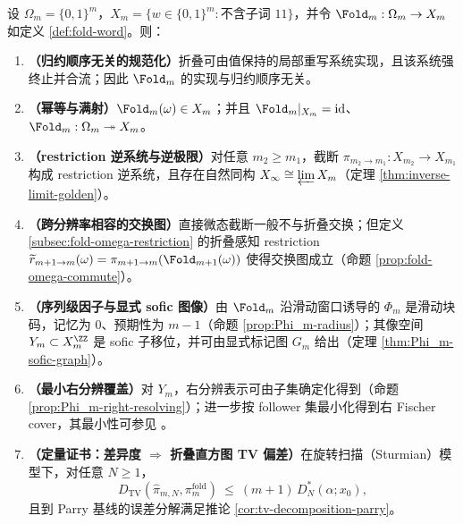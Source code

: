 \begin{theorem}\label{thm:fold-suite}
设 $\Omega_m=\{0,1\}^m$，$X_m=\{w\in\{0,1\}^m:\text{不含子词 }11\}$，并令 $\Fold_m:\Omega_m\to X_m$ 如定义 \ref{def:fold-word}。则：
\begin{enumerate}
\normalfont
  \item \textbf{（归约顺序无关的规范化）}折叠可由值保持的局部重写系统实现，且该系统强终止并合流；因此 $\Fold_m$ 的实现与归约顺序无关。
  \item \textbf{（幂等与满射）}\(\Fold_m(\omega)\in X_m\)；并且 \(\Fold_m|_{X_m}=\mathrm{id}\)、\(\Fold_m:\Omega_m\twoheadrightarrow X_m\)。
  \item \textbf{（restriction 逆系统与逆极限）}对任意 $m_2\ge m_1$，截断 $\pi_{m_2\to m_1}:X_{m_2}\to X_{m_1}$ 构成 restriction 逆系统，且存在自然同构 \(X_\infty\cong\varprojlim X_m\)（定理 \ref{thm:inverse-limit-golden}）。
\item \textbf{（跨分辨率相容的交换图）}直接微态截断一般不与折叠交换；但定义 \ref{subsec:fold-omega-restriction} 的折叠感知 restriction \(\widetilde r_{m+1\to m}(\omega)=\pi_{m+1\to m}(\Fold_{m+1}(\omega))\) 使得交换图成立（命题 \ref{prop:fold-omega-commute}）。
  \item \textbf{（序列级因子与显式 sofic 图像）}由 \(\Fold_m\) 沿滑动窗口诱导的 \(\Phi_m\) 是滑动块码，记忆为 $0$、预期性为 $m-1$（命题 \ref{prop:Phi_m-radius}）；其像空间 \(Y_m\subset X_m^{\ZZ}\) 是 sofic 子移位，并可由显式标记图 \(G_m\) 给出（定理 \ref{thm:Phi_m-sofic-graph}）。
  \item \textbf{（最小右分辨覆盖）}对 \(Y_m\)，右分辨表示可由子集确定化得到（命题 \ref{prop:Phi_m-right-resolving}）；进一步按 follower 集最小化得到右 Fischer cover，其最小性可参见 \cite{LindMarcus1995,Kitchens1998SymbolicDynamics}。
  \item \textbf{（定量证书：差异度 \(\Rightarrow\) 折叠直方图 TV 偏差）}在旋转扫描（Sturmian）模型下，对任意 $N\ge 1$，
  \[
  D_{\mathrm{TV}}(\hat{\pi}_{m,N},\pi_m^{\mathrm{fold}})\ \le\ (m+1)\,D_N^*(\alpha;x_0),
  \]
  且到 Parry 基线的误差分解满足推论 \ref{cor:tv-decomposition-parry}。
\end{enumerate}
\end{theorem}

